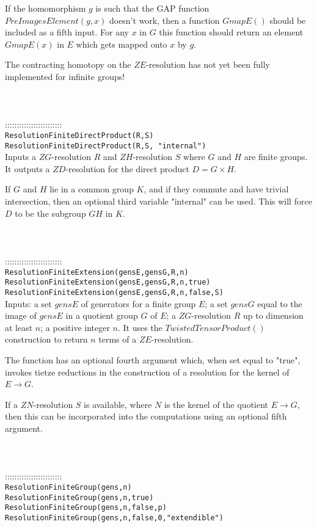 \documentclass[a4paper,11pt]{report}
\begin{document}
{ If the homomorphism $g$ is such that the GAP function $PreImagesElement(g,x)$ doesn't work, then a function $GmapE()$ should be included as a fifth input. For any $x$ in $G$ this function should return an element $GmapE(x)$ in $E$ which gets mapped onto $x$ by $g$.

 The contracting homotopy on the $ZE$-resolution has not yet been fully implemented for infinite groups! \\
 \\
 \\
 \\
 ::::::::::::::::::::::::\\
 \texttt{ResolutionFiniteDirectProduct(R,S) }\\
 \texttt{ResolutionFiniteDirectProduct(R,S, "internal")}\\
 

 Inputs a $ZG$-resolution $R$ and $ZH$-resolution $S$ where $G$ and $H$ are finite groups. It outputs a $ZD$-resolution for the direct product $D=G{\ensuremath{\times}}H$.

 If $G$ and $H$ lie in a common group $K$, and if they commute and have trivial intersection, then an optional third
variable "internal" can be used. This will force $D$ to be the subgroup $GH$ in $K$. \\
 \\
 \\
 \\
 ::::::::::::::::::::::::\\
 \texttt{ResolutionFiniteExtension(gensE,gensG,R,n)}\\
 \texttt{ResolutionFiniteExtension(gensE,gensG,R,n,true) }\\
 \texttt{ResolutionFiniteExtension(gensE,gensG,R,n,false,S) }\\
 

 Inputs: a set $gensE$ of generators for a finite group $E$; a set $gensG$ equal to the image of $gensE$ in a quotient group $G$ of $E$; a $ZG$-resolution $R$ up to dimension at least $n$; a positive integer $n$. It uses the $TwistedTensorProduct()$ construction to return $n$ terms of a $ZE$-resolution.

 The function has an optional fourth argument which, when set equal to "true",
invokes tietze reductions in the construction of a resolution for the kernel
of $E \longrightarrow G$.

 If a $ZN$-resolution $S$ is available, where $N$ is the kernel of the quotient $E \longrightarrow G$, then this can be incorporated into the computations using an optional fifth
argument. \\
 \\
 \\
 \\
 ::::::::::::::::::::::::\\
 \texttt{ResolutionFiniteGroup(gens,n)}\\
 \texttt{ResolutionFiniteGroup(gens,n,true)}\\
 \texttt{ResolutionFiniteGroup(gens,n,false,p) }\\
 \texttt{ResolutionFiniteGroup(gens,n,false,0,"extendible") }\\
 

}
\end{document}
